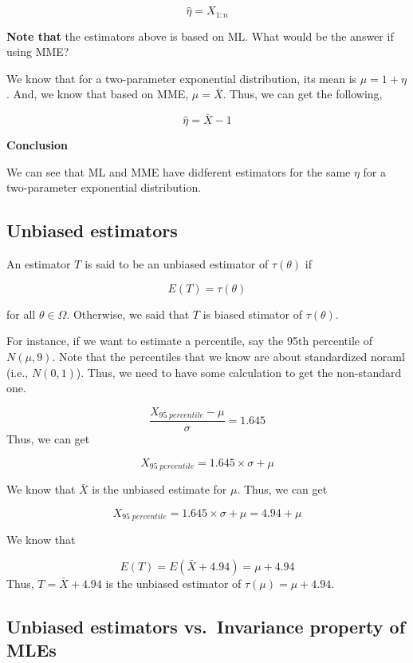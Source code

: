 \documentclass[]{book}
\begin{document}
\[\hat{\eta}=X_{1:n}\]

\textbf{Note that} the estimators above is based on ML. What would be the answer if using MME?

We know that for a two-parameter exponential distribution, its mean is \(\mu=1+\eta\). And, we know that based on MME, \(\mu=\bar{X}\). Thus, we can get the following,

\[\hat{\eta}=\bar{X}-1\]

\textbf{Conclusion}

We can see that ML and MME have didferent estimators for the same \(\eta\) for a two-parameter exponential distribution.

\hypertarget{unbiased-estimators}{%
\subsection{Unbiased estimators}\label{unbiased-estimators}}

An estimator \(T\) is said to be an unbiased estimator of \(\tau(\theta)\) if

\[E(T)=\tau(\theta)\]

for all \(\theta \in \Omega\). Otherwise, we said that \(T\) is biased stimator of \(\tau(\theta)\).

For instance, if we want to estimate a percentile, say the 95th percentile of \(N(\mu,9)\). Note that the percentiles that we know are about standardized noraml (i.e., \(N(0,1)\)). Thus, we need to have some calculation to get the non-standard one.

\[\frac{X_{95 \; percentile}-\mu}{\sigma}=1.645\]
Thus, we can get

\[X_{95 \; percentile}=1.645 \times \sigma +\mu\]

We know that \(\bar{X}\) is the unbiased estimate for \(\mu\). Thus, we can get

\[X_{95 \; percentile}=1.645 \times \sigma +\mu=4.94+\mu\]

We know that

\[E(T)=E(\bar{X}+4.94)=\mu+4.94\]
Thus, \(T=\bar{X}+4.94\) is the unbiased estimator of \(\tau(\mu)=\mu+4.94\).

\hypertarget{unbiased-estimators-vs.-invariance-property-of-mles}{%
\subsection{Unbiased estimators vs.~Invariance property of MLEs}\label{unbiased-estimators-vs.-invariance-property-of-mles}}
\end{document}
